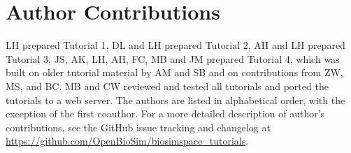 \documentclass[9pt,tutorial,pubversion]{livecoms}
\newcommand{\githubrepository}{\url{https://github.com/OpenBioSim/biosimspace_tutorials}}  %
\begin{document}
%
%

%

\section{Author Contributions}
%
LH prepared Tutorial 1, DL and LH prepared Tutorial 2, AH and LH prepared Tutorial 3, JS, AK, LH, AH, FC, MB and JM prepared Tutorial 4, which was built on older tutorial material by AM and SB and on contributions from ZW, MS, and BC. MB and CW reviewed and tested all tutorials and ported the tutorials to a web server. The authors are listed in alphabetical order, with the exception of the first coauthor.
For a more detailed description of author's contributions,
see the GitHub issue tracking and changelog at \githubrepository.
\end{document}
